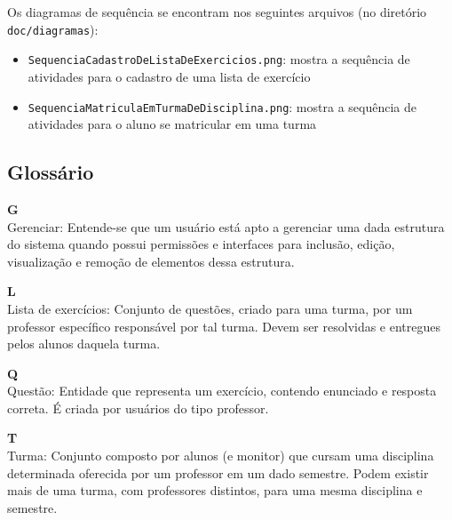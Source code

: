 \documentclass[12pt,letterpaper]{article}
\begin{document}
Os diagramas de sequência se encontram nos seguintes arquivos (no diretório \texttt{doc/diagramas}):

\begin{itemize}
\item{}\texttt{SequenciaCadastroDeListaDeExercicios.png}: mostra a sequência de atividades para o cadastro de uma lista de exercício
\item{}\texttt{SequenciaMatriculaEmTurmaDeDisciplina.png}: mostra a sequência de atividades para o aluno se matricular em uma turma
\end{itemize}






\pagebreak

\subsection{Glossário}

  {\bf G}\\
    Gerenciar: Entende-se que um usuário está apto a gerenciar uma dada
  estrutura do sistema quando possui permissões e interfaces para inclusão,
  edição, visualização e remoção de elementos dessa estrutura. 
  
  {\bf L}\\
	Lista de exercícios: Conjunto de questões, criado para uma turma, por um professor específico responsável por tal turma. Devem ser resolvidas e entregues pelos alunos daquela turma.
 
  {\bf Q}\\
	Questão: Entidade que representa um exercício, contendo enunciado e resposta correta. É criada por usuários do tipo professor.
	
  {\bf T}\\
    Turma: Conjunto composto por alunos (e monitor) que cursam uma disciplina 
    determinada oferecida por um professor em um dado semestre. Podem
    existir mais de uma turma, com professores distintos, para uma mesma 
    disciplina e semestre.  
    
\end{document}
